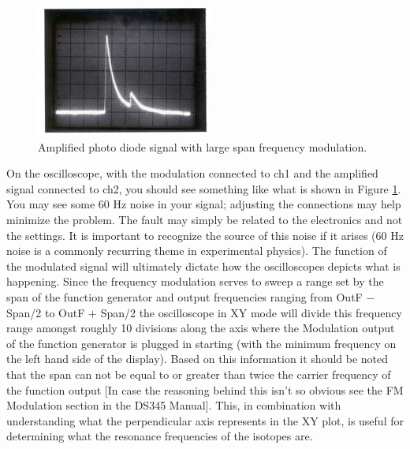 \documentclass{../lab}
\begin{document}
\begin{figure}[ht]
    \centering
    \includegraphics[width=0.7\linewidth]{images/PhotodiodeSignal}
    \caption{Amplified photo diode signal with large span frequency modulation.}
    \label{fig:PhotodiodeSignal}
\end{figure}

On the oscilloscope, with the modulation connected to ch1 and the amplified signal connected to ch2, you should see something like what is shown in Figure \ref{fig:PhotodiodeSignal}. You may see some 60 Hz noise in your signal; adjusting the connections may help minimize the problem. The fault may simply be related to the electronics and not the settings. It is important to recognize the source of this noise if it arises (60 Hz noise is a commonly recurring theme in experimental physics). The function of the modulated signal will ultimately dictate how the oscilloscopes depicts what is happening. Since the frequency modulation serves to sweep a range set by the span of the function generator and output frequencies ranging from OutF $−$ Span/2 to OutF $+$ Span/2 the oscilloscope in XY mode will divide this frequency range amongst roughly 10 divisions along the axis where the Modulation output of the function generator is plugged in starting (with the minimum frequency on the left hand side of the display). Based on this information it should be noted that the span can not be equal to or greater than twice the carrier frequency of the function output [In case the reasoning behind this isn't so obvious see the  FM Modulation section in the DS345 Manual]. This, in combination with understanding what the perpendicular axis represents in the XY plot, is useful for determining what the resonance frequencies of the isotopes are. 

\newpage
\end{document}
